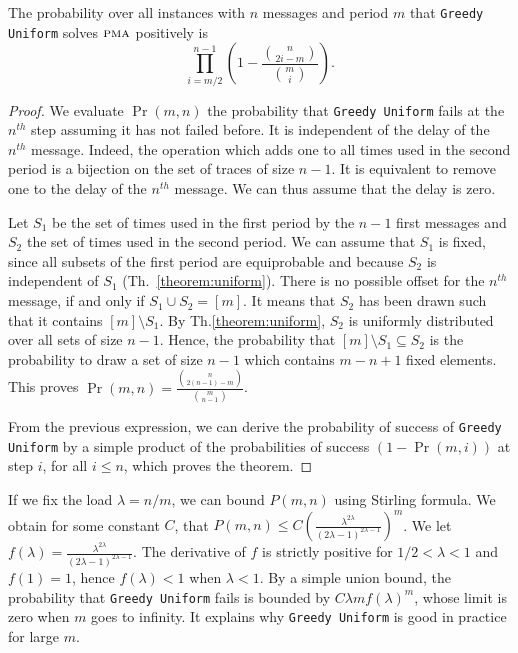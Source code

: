 \documentclass[a4paper,cleveref, autoref, thm-restate,UKenglish]{lipics-v2019}
\newcommand\pma{\textsc{pma}\xspace}
\newcommand\greedyuniform{\texttt{Greedy Uniform}\xspace}
\begin{document}
\begin{theorem}\label{theorem:uniform}
The probability over all instances with $n$ messages and period $m$ that \greedyuniform solves $\pma$ positively is $$\displaystyle{\prod_{i=m/2}^{n-1}(1 - \frac{\binom{n}{2i-m}}{\binom{m}{i}})}.$$
\end{theorem}
\begin{proof}
We evaluate $\Pr(m,n)$ the probability that \greedyuniform fails at the $n^{th}$ step assuming it has not failed before. It is independent of the delay of the $n^{th}$ message. Indeed, the operation which adds one to all times used 
in the second period is a bijection on the set of traces of size $n-1$. It is equivalent to remove one to the delay of the $n^{th}$ message. We can thus assume that the delay is zero.

Let $S_1$ be the set of times used in the first period by the $n-1$ first messages
and $S_2$ the set of times used in the second period. We can assume that $S_1$ is fixed, since all subsets of the first period are equiprobable and because $S_2$ is independent of $S_1$ (Th.~\ref{theorem:uniform}). There is no possible offset for the $n^{th}$ message, if and only if $S_1 \cup S_2 = [m]$. It means that $S_2$ has been drawn such that it contains $[m] \setminus S_1$. By Th.\ref{theorem:uniform}, $S_2$ is uniformly distributed over all sets of size $n-1$. Hence, the probability that  $[m]  \setminus S_1 \subseteq S_2$  is the probability to draw a set of size $n-1$ which contains $m-n + 1$ fixed elements. This proves $\Pr(m,n) = \frac{\binom{n}{2(n-1)-m}}{\binom{m}{n-1}}$.

From the previous expression, we can derive the probability of success of \greedyuniform by a simple product of 
the probabilities of success $(1 - \Pr(m,i))$ at step $i$, for all $i \leq n$, which proves the theorem. 
\end{proof}


If we fix the load $\lambda = n/m$, we can bound $P(m,n)$ using Stirling formula. We obtain for some constant $C$, 
that $P(m,n) \leq C \left(\frac{\lambda^{2\lambda}}{(2\lambda -1)^{2\lambda -1}}\right)^m$.
We let $f(\lambda) = \frac{\lambda^{2\lambda}}{(2\lambda -1)^{2\lambda -1}}$.
The derivative of $f$ is strictly positive for $1/2 < \lambda < 1$ and $f(1) = 1$, hence 
$f(\lambda) < 1$ when $\lambda < 1$. By a simple union bound, the probability that \greedyuniform fails is bounded 
by $C \lambda m f(\lambda)^m$, whose limit is zero when $m$ goes to infinity. 
It explains why \greedyuniform is good in practice for large $m$. 
\end{document}
